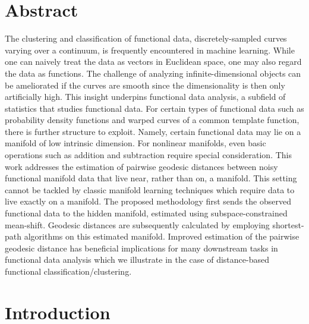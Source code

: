 \newcommand {\To}{\rightarrow}
\newcommand {\TO}{\Rightarrow}
\newcommand {\R}{\mathbb{R}}
\newcommand {\Prob}{\mathbb{P}}
\newcommand{\E}{\mathbb{E}}
\newcommand {\cov}{\textrm{Cov}}
\newcommand {\var}{\textrm{Var}}
\newcommand {\1}{\textrm{\textbf{1}}}
\newcommand{\M}{\mathcal{M}}

\section{Abstract}\label{abstract}

The clustering and classification of functional data, discretely-sampled
curves varying over a continuum, is frequently encountered in machine
learning. While one can naively treat the data as vectors in Euclidean
space, one may also regard the data as functions. The challenge of
analyzing infinite-dimensional objects can be ameliorated if the curves
are smooth since the dimensionality is then only artificially high. This
insight underpins functional data analysis, a subfield of statistics
that studies functional data. For certain types of functional data such
as probability density functions and warped curves of a common template
function, there is further structure to exploit. Namely, certain
functional data may lie on a manifold of low intrinsic dimension. For
nonlinear manifolds, even basic operations such as addition and
subtraction require special consideration. This work addresses the
estimation of pairwise geodesic distances between noisy functional
manifold data that live near, rather than on, a manifold. This setting
cannot be tackled by classic manifold learning techniques which require
data to live exactly on a manifold. The proposed methodology first sends
the observed functional data to the hidden manifold, estimated using
subspace-constrained mean-shift. Geodesic distances are subsequently
calculated by employing shortest-path algorithms on this estimated
manifold. Improved estimation of the pairwise geodesic distance has
beneficial implications for many downstream tasks in functional data
analysis which we illustrate in the case of distance-based functional
classification/clustering.

\section{Introduction}\label{introduction}

